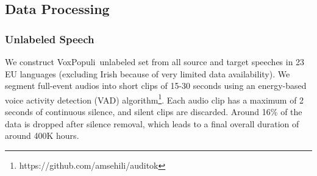 \documentclass[11pt,a4paper]{article}
\newcommand{\vp}{VoxPopuli}
\begin{document}
 \subsection{Data Processing}
\label{sec:data_processing}
\subsubsection{Unlabeled Speech}
We construct \vp~unlabeled set from all source and target speeches in 23 EU languages (excluding Irish because of very limited data availability). We segment full-event audios into short clips of 15-30 seconds using an energy-based voice activity detection (VAD) algorithm\footnote{https://github.com/amsehili/auditok}. Each audio clip has a maximum of 2 seconds of continuous silence, and silent clips are discarded. Around 16\% of the data is dropped after silence removal, which leads to a final overall duration of around 400K hours.
\end{document}
